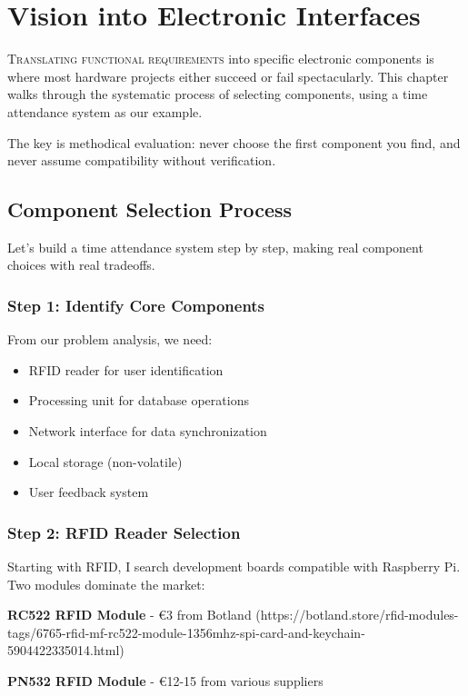 \chapter{Vision into Electronic Interfaces}

\lettrine{T}{ranslating functional requirements} into specific electronic components is where most hardware projects either succeed or fail spectacularly. This chapter walks through the systematic process of selecting components, using a time attendance system as our example.

The key is methodical evaluation: never choose the first component you find, and never assume compatibility without verification.

\section{Component Selection Process}

Let's build a time attendance system step by step, making real component choices with real tradeoffs.

\subsection{Step 1: Identify Core Components}

From our problem analysis, we need:
\begin{itemize}
\item RFID reader for user identification
\item Processing unit for database operations
\item Network interface for data synchronization
\item Local storage (non-volatile)
\item User feedback system
\end{itemize}

\subsection{Step 2: RFID Reader Selection}

Starting with RFID, I search development boards compatible with Raspberry Pi. Two modules dominate the market:

\textbf{RC522 RFID Module} - €3 from Botland (https://botland.store/rfid-modules-tags/6765-rfid-mf-rc522-module-1356mhz-spi-card-and-keychain-5904422335014.html)

\textbf{PN532 RFID Module} - €12-15 from various suppliers

